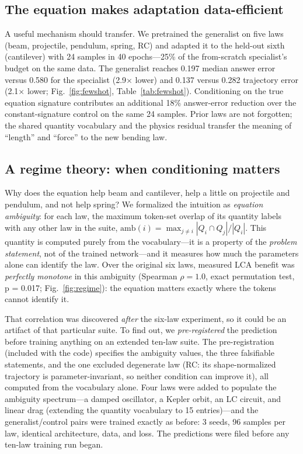 \documentclass[11pt,a4paper]{article}
\newcommand{\LCA}{{\scshape LCA}}
\begin{document}
\subsection{The equation makes adaptation data-efficient}
\label{sec:fewshot}

A useful mechanism should transfer. We pretrained the generalist on five laws
(beam, projectile, pendulum, spring, RC) and adapted it to the held-out sixth
(cantilever) with 24 samples in 40 epochs---25\% of the from-scratch
specialist's budget on the same data. The generalist reaches 0.197 median
answer error versus 0.580 for the specialist (2.9$\times$ lower) and 0.137
versus 0.282 trajectory error (2.1$\times$ lower;
Fig.~\ref{fig:fewshot}, Table~\ref{tab:fewshot}). Conditioning on the true
equation signature contributes an additional 18\% answer-error reduction over
the constant-signature control on the same 24 samples. Prior laws are not
forgotten; the shared quantity vocabulary and the physics residual transfer
the meaning of ``length'' and ``force'' to the new bending law.

\subsection{A regime theory: when conditioning matters}
\label{sec:regime}

Why does the equation help beam and cantilever, help a little on projectile
and pendulum, and not help spring? We formalized the intuition as
\emph{equation ambiguity}: for each law, the maximum token-set overlap of its
quantity labels with any other law in the suite,
$\mathrm{amb}(i) = \max_{j \neq i} |Q_i \cap Q_j| / |Q_i|$. This quantity is
computed purely from the vocabulary---it is a property of the \emph{problem
statement}, not of the trained network---and it measures how much the
parameters alone can identify the law. Over the original six laws, measured
\LCA{} benefit was \emph{perfectly monotone} in this ambiguity (Spearman
$\rho = 1.0$, exact permutation test, p = 0.017; Fig.~\ref{fig:regime}): the
equation matters exactly where the tokens cannot identify it.

That correlation was discovered \emph{after} the six-law experiment, so it
could be an artifact of that particular suite. To find out, we
\emph{pre-registered} the prediction before training anything on an extended
ten-law suite. The pre-registration (included with the code) specifies the
ambiguity values, the three falsifiable statements, and the one excluded
degenerate law (RC: its shape-normalized trajectory is parameter-invariant,
so neither condition can improve it), all computed from the vocabulary alone.
Four laws were added to populate the ambiguity spectrum---a damped
oscillator, a Kepler orbit, an LC circuit, and linear drag (extending the
quantity vocabulary to 15 entries)---and the generalist/control pairs were
trained exactly as before: 3 seeds, 96 samples per law, identical
architecture, data, and loss. The predictions were filed before any ten-law
training run began.
\end{document}

